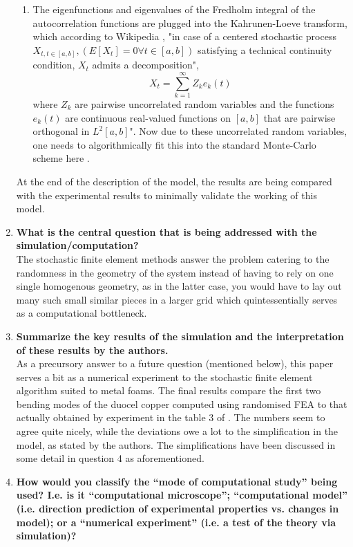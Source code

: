 \documentclass{article}
\begin{document}
\begin{enumerate}
\begin{enumerate}
		\item The eigenfunctions and eigenvalues of the Fredholm integral of the autocorrelation functions are plugged into the Kahrunen-Loeve transform, which according to Wikipedia \cite{WikipediaLink2}, "in case of a centered stochastic process $X_{t,t\in[a,b]}, (E[X_t] = 0 \forall t \in [a,b])$ satisfying a technical continuity condition, $X_t$ admits a decomposition",
\begin{equation}
X_t = \sum_{k=1}^{\infty} Z_k e_k(t)
\end{equation}
where $Z_k$ are pairwise uncorrelated random variables and the functions $e_k(t)$ are continuous real-valued functions on $[a,b]$ that are pairwise orthogonal in $L^2[a,b]$". Now due to these uncorrelated random variables, one needs to algorithmically fit this into the standard Monte-Carlo scheme here \cite{originalpaper}.
	\end{enumerate}
	At the end of the description of the model, the results are being compared with the experimental results to minimally validate the working of this model.
	\item \textbf{What is the central question that is being addressed with the simulation/computation?}\\
	The stochastic finite element methods answer the problem catering to the randomness in the geometry of the system instead of having to rely on one single homogenous geometry, as in the latter case, you would have to lay out many such small similar pieces in a larger grid which quintessentially serves as a computational bottleneck.
	\item \textbf{Summarize the key results of the simulation and the interpretation of these results by the authors.}\\
	As a precursory answer to a future question (mentioned below), this paper serves a bit as a numerical experiment to the stochastic finite element algorithm suited to metal foams. The final results compare the first two bending modes of the duocel copper computed using randomised FEA to that actually obtained by experiment in the table 3 of \cite{originalpaper}. The numbers seem to agree quite nicely, while the deviations owe a lot to the simplification in the model, as stated by the authors. The simplifications have been discussed in some detail in question 4 as aforementioned.
	\item \textbf{How would you classify the “mode of computational study” being used? I.e. is it “computational microscope”; “computational model” (i.e. direction prediction of experimental properties vs. changes in model); or a “numerical experiment” (i.e. a test of the theory via simulation)?}\\

\end{enumerate}
\end{document}
